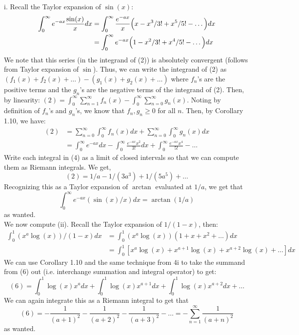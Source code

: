 \documentclass[12pt]{article}
\newenvironment{solution}[2][Solution]{\begin{trivlist}
\item[\hskip \labelsep {\bfseries #1}]}{\end{trivlist}}
\begin{document}
\begin{solution}{}
	\begin{enumerate}
		i. Recall the Taylor expansion of $\sin(x)$:
		\begin{align}
			\int_0^{\infty} e^{-ax}\frac{\sin(x)}{x}dx &= \int_0^{\infty} \frac{e^{-ax}}{x}\Big{(}x-x^3/3!+x^5/5! -\hdots\Big{)}dx \\
				&= \int_0^{\infty} e^{-ax}\Big{(}1-x^2/3!+x^4/5!-\hdots\Big{)}dx
		\end{align}
		We note that this series (in the integrand of (2)) is absolutely convergent (follows from Taylor expansion of $\sin$). Thus, we can write the integrand of
		(2) as $(f_1(x) + f_2(x) + \hdots) - (g_1(x) + g_2(x) + \hdots)$ where $f_n$'s are the positive terms and the $g_n$'s are the negative terms of the integrand of (2).
		Then, by linearity: $(2) = \int_0^{\infty} \sum_{n=1}^{\infty} f_n(x) - \int_0^{\infty} \sum_{n=0}^{\infty} g_n(x)$. Noting by definition of $f_n$'s and $g_n$'s, we know that
		$f_n,g_n\geq 0$ for all $n$. Then, by Corollary 1.10, we have:
		\begin{align}
			(2) &= \sum_{n=0}^{\infty} \int_0^{\infty} f_n(x)dx + \sum_{n=0}^{\infty} \int_0^{\infty} g_n(x)dx \\
				&= \int_0^{\infty} e^{-ax}dx - \int_0^{\infty} \frac{e^{-ax}x^2}{3!}dx + \int_0^{\infty} \frac{e^{-ax}x^4}{5!} - \hdots
		\end{align}
		Write each integral in (4) as a limit of closed intervals so that we can compute them as Riemann integrals. We get,
		\[ (2) = 1/a - 1/(3a^3) + 1/(5a^5) + \hdots \]
		Recognizing this as a Taylor expansion of $\arctan$ evaluated at $1/a$, we get that 
		\[ \int_0^{\infty} e^{-ax}(\sin(x)/x)dx = \arctan(1/a) \]
		as wanted.\\
		
		We now compute (ii). Recall the Taylor expansion of $1/(1-x)$, then:
		\begin{align}
			\int_0^1 (x^a\log(x))/(1-x)dx &= \int_0^1 (x^a\log(x))(1+x+x^2+\hdots)dx \\
				&= \int_0^1 [x^a\log(x) + x^{a+1}\log(x) + x^{a+2}\log(x) + \hdots]dx
		\end{align}
		We can use Corollary 1.10 and the same technique from 4i to take the summand from (6) out (i.e. interchange summation and integral operator) to get:
		\[ (6) = \int_0^1 \log(x)x^adx + \int_0^1 \log(x)x^{a+1}dx + \int_0^1 \log(x)x^{a+2}dx + \hdots \]
		We can again integrate this as a Riemann integral to get that
		\[ (6) = -\frac{1}{(a+1)^2} - \frac{1}{(a+2)^2} - \frac{1}{(a+3)^2} - \hdots = -\sum_{n=1}^{\infty} \frac{1}{(a+n)^2} \]
		as wanted.
	\end{enumerate}
\end{solution}
\end{document}
